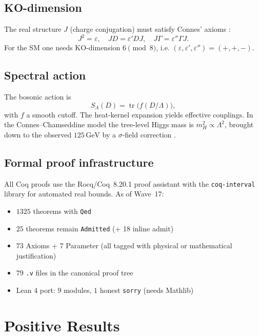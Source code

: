 \documentclass[11pt,a4paper]{article}
\theoremstyle{definition}
\newcommand{\tr}{\operatorname{tr}}
\begin{document}
\subsection{KO-dimension}

The real structure $J$ (charge conjugation) must satisfy Connes' axioms
\cite{Connes:1996}:
\begin{equation}
  J^2 = \varepsilon, \quad JD = \varepsilon' DJ, \quad J\Gamma = \varepsilon'' \Gamma J.
\end{equation}
For the SM one needs KO-dimension $6 \pmod 8$, i.e.
$(\varepsilon, \varepsilon', \varepsilon'') = (+, +, -)$.

\subsection{Spectral action}

The bosonic action is
\begin{equation}\label{eq:spectral-action}
  S_\Lambda(D) = \tr\bigl(f(D/\Lambda)\bigr),
\end{equation}
with $f$ a smooth cutoff. The heat-kernel expansion yields effective
couplings. In the Connes--Chamseddine model the tree-level Higgs mass is
$m_H^2 \propto \Lambda^2$, brought down to the observed $125\,\text{GeV}$
by a $\sigma$-field correction \cite{ConnesMarcolli:2008}.

\subsection{Formal proof infrastructure}\label{sec:coqstats}

All Coq proofs use the Rocq/Coq~8.20.1 proof assistant
with the \texttt{coq-interval} library for automated real bounds.
As of Wave~17:
\begin{itemize}
  \item $1325$ theorems with \texttt{Qed}
  \item $25$ theorems remain \texttt{Admitted} (+ 18 inline admit)
  \item $73$ Axioms + 7 Parameter (all tagged with physical or mathematical justification)
  \item $79$ \texttt{.v} files in the canonical proof tree
  \item Lean 4 port: $9$ modules, $1$ honest \texttt{sorry} (needs Mathlib)
\end{itemize}

\section{Positive Results}\label{sec:positive}
\end{document}
